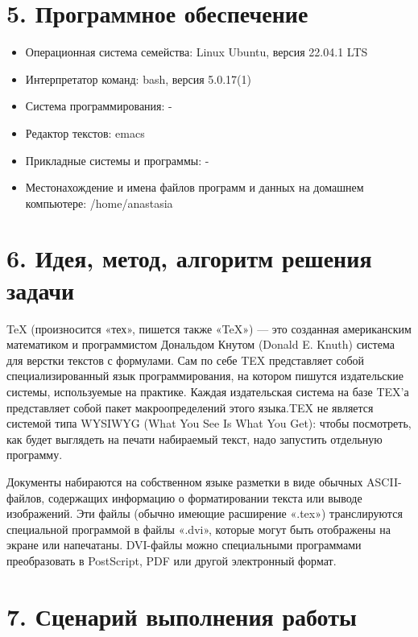 \documentclass[11pt]{report}
\begin{document}
\section*{5. Программное обеспечение}
\begin{itemize}
     \item Операционная система семейства: Linux Ubuntu, версия 22.04.1 LTS
     \item Интерпретатор команд: bash, версия 5.0.17(1)
     \item Система программирования: -
     \item Редактор текстов: emacs
     \item Прикладные системы и программы: -
     \item Местонахождение и имена файлов программ и данных на домашнем компьютере: /home/anastasia
\end{itemize}

\section*{6. Идея, метод, алгоритм решения задачи}

\hspace{10mm}
TeX (произносится «тех», пишется также «TeX») — это созданная американским математиком и программистом Дональдом Кнутом (Donald E. Knuth) система для верстки текстов с формулами. Сам по себе TEX представляет собой специализированный язык программирования, на котором пишутся издательские системы, используемые на практике. Каждая издательская система на базе TEX’а представляет собой пакет макроопределений этого языка.TEX не является системой типа WYSIWYG (What You See Is What You Get): чтобы посмотреть, как будет выглядеть на печати набираемый текст, надо запустить отдельную программу.

\hspace{5mm}
Документы набираются на собственном языке разметки в виде обычных ASCII-файлов, содержащих информацию о форматировании текста или выводе изображений. Эти файлы (обычно имеющие расширение «.tex») транслируются специальной программой в файлы «.dvi», которые могут быть отображены на экране или напечатаны. DVI-файлы можно специальными программами преобразовать в PostScript, PDF или другой электронный формат.

\section*{7. Сценарий выполнения работы}
\end{document}
